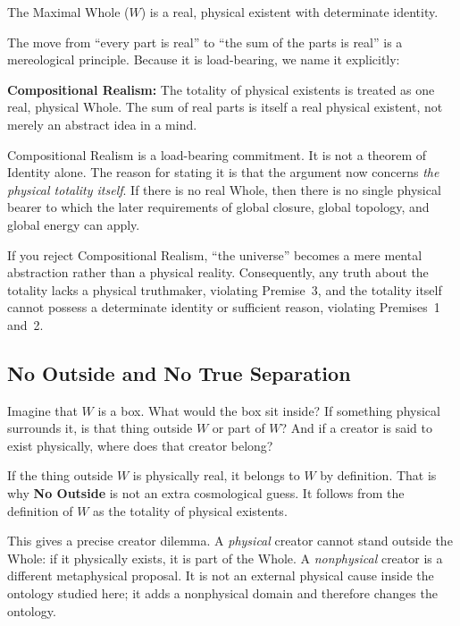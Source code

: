 \documentclass[11pt]{article}
\theoremstyle{canonstyle}
\begin{document}
\begin{keyresult}
The Maximal Whole ($W$) is a real, physical existent with determinate identity.
\end{keyresult}

The move from ``every part is real'' to ``the sum of the parts is real'' is a mereological principle. Because it is load-bearing, we name it explicitly:

\begin{keyresult}
\textbf{Compositional Realism:} The totality of physical existents is treated as one real, physical Whole. The sum of real parts is itself a real physical existent, not merely an abstract idea in a mind.
\end{keyresult}

Compositional Realism is a load-bearing commitment. It is not a theorem of Identity alone. The reason for stating it is that the argument now concerns \emph{the physical totality itself}. If there is no real Whole, then there is no single physical bearer to which the later requirements of global closure, global topology, and global energy can apply.

\begin{ifyoudisagree}
If you reject Compositional Realism, ``the universe'' becomes a mere mental abstraction rather than a physical reality. Consequently, any truth about the totality lacks a physical truthmaker, violating Premise~3, and the totality itself cannot possess a determinate identity or sufficient reason, violating Premises~1 and~2.
\end{ifyoudisagree}

\subsection{No Outside and No True Separation}

\begin{reflect}
Imagine that $W$ is a box. What would the box sit inside? If something physical surrounds it, is that thing outside $W$ or part of $W$? And if a creator is said to exist physically, where does that creator belong?
\end{reflect}

If the thing outside $W$ is physically real, it belongs to $W$ by definition. That is why \textbf{No Outside} is not an extra cosmological guess. It follows from the definition of $W$ as the totality of physical existents.

This gives a precise creator dilemma. A \emph{physical} creator cannot stand outside the Whole: if it physically exists, it is part of the Whole. A \emph{nonphysical} creator is a different metaphysical proposal. It is not an external physical cause inside the ontology studied here; it adds a nonphysical domain and therefore changes the ontology.
\end{document}
